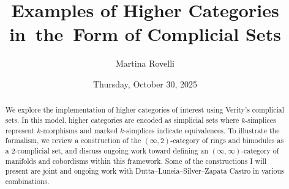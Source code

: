 \documentclass{UAmathtalk}
\author{Martina Rovelli}
\title{Examples of Higher Categories in~the~Form of Complicial Sets}
\date{Thursday, October 30, 2025}
\begin{document}
\maketitle

\begin{abstract}
We explore the implementation of higher categories of interest using Verity’s complicial sets. In this model, higher categories are encoded as simplicial sets where $k$-simplices represent $k$-morphisms and marked $k$-simplices indicate equivalences. To illustrate the formalism, we review a construction of the $(\infty,2)$-category of rings and bimodules as a $2$-complicial set, and discuss ongoing work toward defining an $(\infty,\infty)$-category of manifolds and cobordisms within this framework. Some of the constructions I will present are joint and ongoing work with Dutta--Luneia--Silver--Zapata Castro in various combinations.
\end{abstract}
\end{document}
